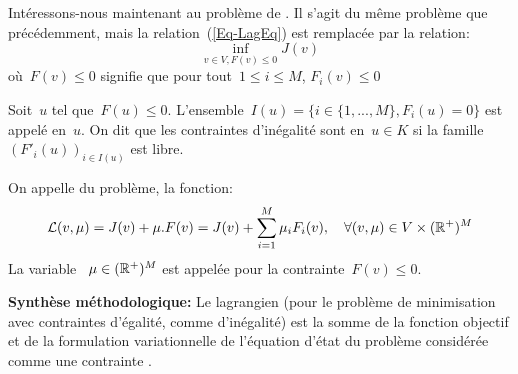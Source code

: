 \medskip
Intéressons-nous maintenant au problème de .
Il s'agit du même problème que précédemment, mais la relation~(\ref{Eq-LagEq}) est remplacée par la relation:
\begin{equation}\label{Eq-LagIneq}
\inf_{v\in V, F(v)\le0} J(v)
\end{equation}
où~$F(v)\le0$ signifie que pour tout~$1\le i\le M$, $F_i(v)\le0$

\begin{definition}
Soit~$u$ tel que~$F(u)\le0$.
L'ensemble~$I(u)=\{i\in\{1, ..., M\}, F_i(u)=0\}$ est appelé  en~$u$.
On dit que les contraintes d'inégalité sont  en~$u\in K$ si la famille~$(F'_i(u))_{i\in I(u)}$ est libre.
\end{definition}

\begin{definition}
On appelle  du problème, la fonction:
\begin{equation}
\mathcal{L}(v,\mu) = J(v)+\mu.F(v) = J(v) + \displaystyle\sum_{i=1}^M \mu_iF_i(v), 
\quad \forall (v,\mu)\in V\times(\mathbb R^+)^M
\end{equation}
La variable ~$\mu\in(\mathbb R^+)^M$ est appelée  pour la contrainte~$F(v)\le0$.
\end{definition}

\noindent\textbf{Synthèse méthodologique:} Le lagrangien (pour le problème de minimisation avec contraintes d'égalité, comme d'inégalité) est la somme de la fonction objectif et de la formulation variationnelle de l'équation d'état du problème considérée comme une contrainte .

